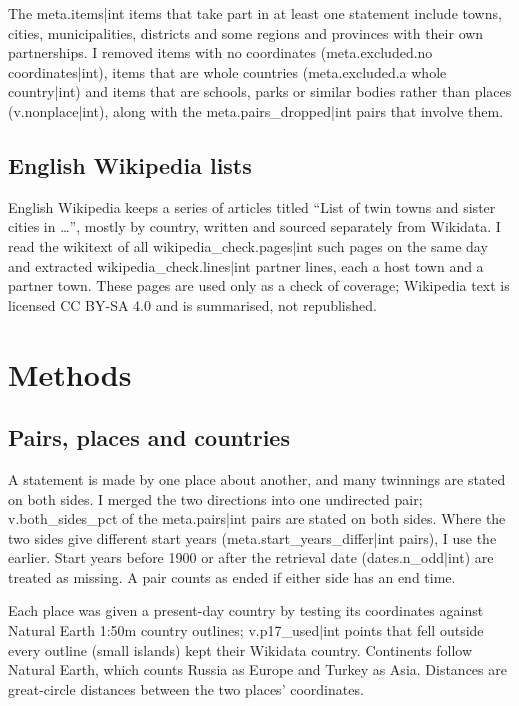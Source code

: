 \documentclass[11pt,a4paper]{article}
\begin{document}
The {{meta.items|int}} items that take part in at least one statement include towns, cities, municipalities, districts and some regions and provinces with their own partnerships. I removed items with no coordinates ({{meta.excluded.no coordinates|int}}), items that are whole countries ({{meta.excluded.a whole country|int}}) and items that are schools, parks or similar bodies rather than places ({{v.nonplace|int}}), along with the {{meta.pairs_dropped|int}} pairs that involve them.

\subsection{English Wikipedia lists}

English Wikipedia keeps a series of articles titled ``List of twin towns and sister cities in \ldots'', mostly by country, written and sourced separately from Wikidata. I read the wikitext of all {{wikipedia_check.pages|int}} such pages on the same day and extracted {{wikipedia_check.lines|int}} partner lines, each a host town and a partner town. These pages are used only as a check of coverage; Wikipedia text is licensed CC BY-SA 4.0 and is summarised, not republished.

\section{Methods}

\subsection{Pairs, places and countries}

A statement is made by one place about another, and many twinnings are stated on both sides. I merged the two directions into one undirected pair; {{v.both_sides_pct}} of the {{meta.pairs|int}} pairs are stated on both sides. Where the two sides give different start years ({{meta.start_years_differ|int}} pairs), I use the earlier. Start years before 1900 or after the retrieval date ({{dates.n_odd|int}}) are treated as missing. A pair counts as ended if either side has an end time.

Each place was given a present-day country by testing its coordinates against Natural Earth 1:50m country outlines; {{v.p17_used|int}} points that fell outside every outline (small islands) kept their Wikidata country. Continents follow Natural Earth, which counts Russia as Europe and Turkey as Asia. Distances are great-circle distances between the two places' coordinates.
\end{document}
